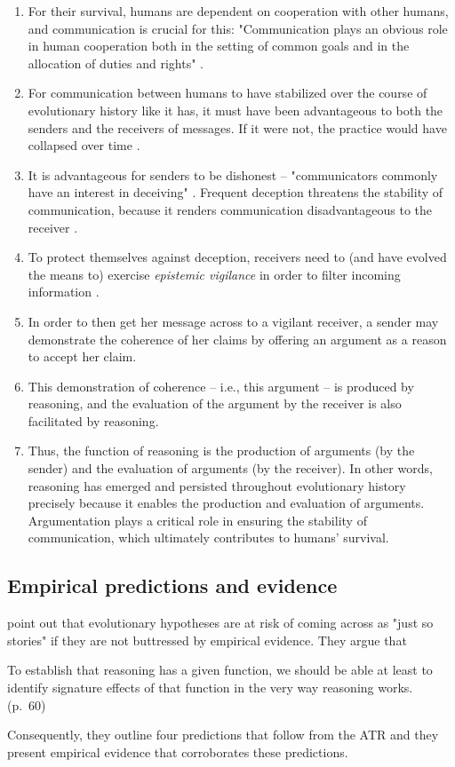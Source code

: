\begin{enumerate}[label=(\arabic*)]
    \item For their survival, humans are dependent on cooperation with other humans, and communication is crucial for this: "Communication plays an obvious role in human cooperation both in the setting of common goals and in the allocation of duties and rights" \citep[p.~60]{MS11}.
    \item For communication between humans to have stabilized over the course of evolutionary history like it has, it must have been advantageous to both the senders and the receivers of messages. If it were not, the practice would have collapsed over time \citep{Sperber01}.
    \item It is advantageous for senders to be dishonest -- "communicators commonly have an interest in deceiving" \citep[p.~160]{MS09}. Frequent deception threatens the stability of communication, because it renders communication disadvantageous to the receiver \citep{Sperber01}.
    \item To protect themselves against deception, receivers need to (and have evolved the means to) exercise \emph{epistemic vigilance} in order to filter incoming information \citep{Sperber10}.
    \item In order to then get her message across to a vigilant receiver, a sender may demonstrate the coherence of her claims by offering an argument as a reason to accept her claim.
    \item This demonstration of coherence -- i.e., this argument -- is produced by reasoning, and the evaluation of the argument by the receiver is also facilitated by reasoning.
    \item Thus, the function of reasoning is the production of arguments (by the sender) and the evaluation of arguments (by the receiver). In other words, reasoning has emerged and persisted throughout evolutionary history precisely because it enables the production and evaluation of arguments. Argumentation plays a critical role in ensuring the stability of communication, which ultimately contributes to humans' survival.
\end{enumerate}

\subsection{Empirical predictions and evidence}

\citet{MS11} point out that evolutionary hypotheses are at risk of coming across as "just so stories" if they are not buttressed by empirical evidence. They argue that
\begin{quoting}
    To establish that reasoning has a given function, we should be able at least to identify signature effects of that function in the very way reasoning works.
    \hfill (p.~60)
\end{quoting}
Consequently, they outline four predictions that follow from the ATR and they present empirical evidence that corroborates these predictions.

